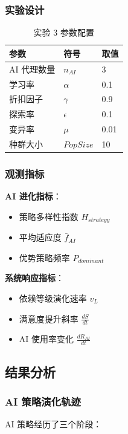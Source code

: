 \documentclass[a4paper,12pt]{article}
\begin{document}
\subsubsection{实验设计}

\begin{table}[H]
\centering
\caption{实验 3 参数配置}
\begin{tabular}{lll}
\toprule
\textbf{参数} & \textbf{符号} & \textbf{取值} \\
\midrule
AI 代理数量 & $n_{AI}$ & 3 \\
学习率 & $\alpha$ & 0.1 \\
折扣因子 & $\gamma$ & 0.9 \\
探索率 & $\epsilon$ & 0.1 \\
变异率 & $\mu$ & 0.01 \\
种群大小 & $PopSize$ & 10 \\
\bottomrule
\end{tabular}
\end{table}

\subsubsection{观测指标}

\textbf{AI 进化指标}：
\begin{itemize}
    \item 策略多样性指数 $H_{strategy}$
    \item 平均适应度 $\bar{f}_{AI}$
    \item 优势策略频率 $P_{dominant}$
\end{itemize}

\textbf{系统响应指标}：
\begin{itemize}
    \item 依赖等级演化速率 $v_L$
    \item 满意度提升斜率 $\frac{dS}{dt}$
    \item AI 使用率变化 $\frac{dR_{AI}}{dt}$
\end{itemize}

\subsection{结果分析}

\subsubsection{AI 策略演化轨迹}

AI 策略经历了三个阶段：
\end{document}
